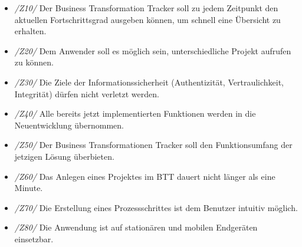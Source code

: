 \begin{itemize} 
    \item[] \emph{/Z10/} Der Business Transformation Tracker soll zu jedem Zeitpunkt den aktuellen Fortschrittsgrad ausgeben können, um schnell eine Übersicht zu erhalten.
    \item[] \emph{/Z20/} Dem Anwender soll es möglich sein, unterschiedliche Projekt aufrufen zu können.
    \item[] \emph{/Z30/} Die Ziele der Informationssicherheit (Authentizität, Vertraulichkeit, Integrität) dürfen nicht verletzt werden.
    \item[] \emph{/Z40/} Alle bereits jetzt implementierten Funktionen werden in die Neuentwicklung übernommen.         
    \item[] \emph{/Z50/} Der Business Transformationen Tracker soll den Funktionsumfang der jetzigen Lösung überbieten.  
    \item[] \emph{/Z60/} Das Anlegen eines Projektes im BTT dauert nicht länger als eine Minute.
    \item[] \emph{/Z70/} Die Erstellung eines Prozessschrittes ist dem Benutzer intuitiv möglich.
    \item[] \emph{/Z80/} Die Anwendung ist auf stationären und mobilen Endgeräten einsetzbar.
\end{itemize}

